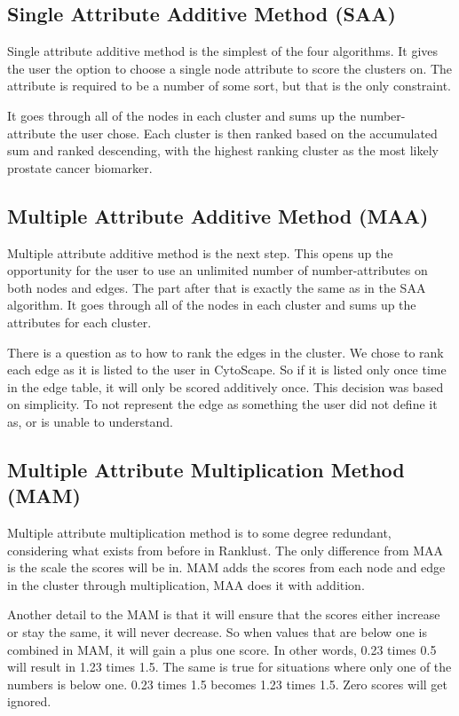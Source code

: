 \subsection{Single Attribute Additive Method (SAA)}
Single attribute additive method is the simplest of the four algorithms. It
gives the user the option to choose a single node attribute to score the
clusters on. The attribute is required to be a number of some sort, but that is
the only constraint.

It goes through all of the nodes in each cluster and sums up the number-
attribute the user chose. Each cluster is then ranked based on the accumulated
sum and ranked descending, with the highest ranking cluster as the most likely
prostate cancer biomarker.

\subsection{Multiple Attribute Additive Method (MAA)}
Multiple attribute additive method is the next step. This opens up the
opportunity for the user to use an unlimited number of number-attributes on both
nodes and edges. The part after that is exactly the same as in the SAA
algorithm. It goes through all of the nodes in each cluster and sums up the
attributes for each cluster.

There is a question as to how to rank the edges in the cluster. We chose to rank
each edge as it is listed to the user in CytoScape. So if it is listed only once
time in the edge table, it will only be scored additively once. This decision
was based on simplicity. To not represent the edge as something the user did not
define it as, or is unable to understand.

\subsection{Multiple Attribute Multiplication Method (MAM)}
Multiple attribute multiplication method is to some degree redundant,
considering what exists from before in Ranklust. The only difference from MAA is
the scale the scores will be in. MAM adds the scores from each node and edge in
the cluster through multiplication, MAA does it with addition. 

Another detail to the MAM is that it will ensure that the scores either increase
or stay the same, it will never decrease. So when values that are below one is
combined in MAM, it will gain a plus one score. In other words, 0.23 times %
0.5 will result in 1.23 times 1.5. The same is true for situations where only
one of the numbers is below one. 0.23 times 1.5 becomes 1.23 times 1.5. Zero
scores will get ignored.

